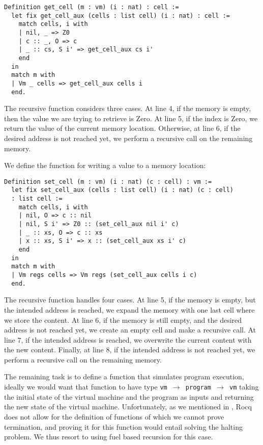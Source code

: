 \begin{lstlisting}[style=Rocq]
Definition get_cell (m : vm) (i : nat) : cell :=
  let fix get_cell_aux (cells : list cell) (i : nat) : cell :=
    match cells, i with
    | nil, _ => Z0
    | c :: _, O => c
    | _ :: cs, S i' => get_cell_aux cs i'
    end
  in
  match m with
  | Vm _ cells => get_cell_aux cells i
  end.
\end{lstlisting}

The recursive function considers three cases. At line 4,  if the memory is empty, then the value we are trying to retrieve is Zero.  At line 5, if the index is Zero, we return the value of the current memory location. Otherwise, at line 6, if the desired address is not reached yet, we perform a recursive call on the remaining memory.

We define the function for writing a value to a memory location:

\begin{lstlisting}[style=Rocq]
Definition set_cell (m : vm) (i : nat) (c : cell) : vm :=
  let fix set_cell_aux (cells : list cell) (i : nat) (c : cell)
  : list cell :=
    match cells, i with
    | nil, O => c :: nil
    | nil, S i' => Z0 :: (set_cell_aux nil i' c)
    | _ :: xs, O => c :: xs
    | x :: xs, S i' => x :: (set_cell_aux xs i' c)
    end
  in
  match m with
  | Vm regs cells => Vm regs (set_cell_aux cells i c)
  end.
\end{lstlisting}

The recursive function handles four cases.  At line 5, if the memory is empty, but the intended address is reached, we expand the memory with one last cell where we store the content. At line 6, if the memory is still empty, and the desired address is not reached yet, we create an empty cell and make a recursive call. At line 7, if the intended address is reached, we overwrite the current content with the new content. Finally, at line 8, if the intended address is not reached yet, we perform a recursive call on the remaining memory.

The remaining task is to define a function that simulates program execution, ideally we would want that function to have type \texttt{vm $\to$ program $\to$ vm} taking the initial state of the virtual machine and the program as inputs and returning the new state of the virtual machine.
Unfortunately, as we mentioned in , Rocq does not allow for the definition of functions of which we cannot prove termination, and proving it for this function would entail solving the halting problem. We thus resort to using fuel based recursion for this case.

